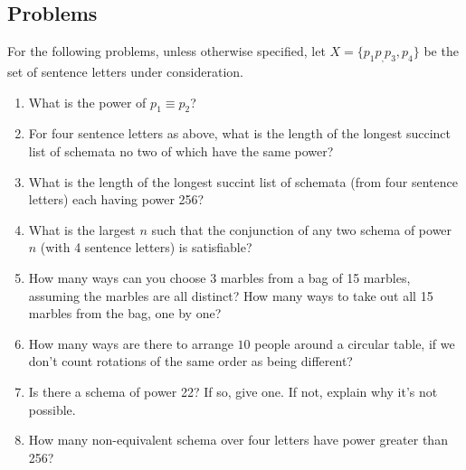 \newpage
\begin{mdframed}[linewidth=1]
\section*{Problems}
For the following problems, unless otherwise specified, let $X = \{p_1 p_, p_3, p_4\}$ be the set of sentence letters under consideration. 
\begin{enumerate}
    \item What is the power of $p_1 \equiv p_2$?

    \item For four sentence letters as above, what is the length of the longest succinct list of schemata no two of which have the same power?

    \item What is the length of the longest succint list of schemata (from four sentence letters) each having power 256?

    \item What is the largest $n$ such that the conjunction of any two schema of power $n$ (with 4 sentence letters) is satisfiable?

    \item How many ways can you choose 3 marbles from a bag of 15 marbles, assuming the marbles are all distinct? How many ways to take out all 15 marbles from the bag, one by one? 

    \item How many ways are there to arrange $10$ people around a circular table, if we don't count rotations of the same order as being different?

    \item Is there a schema of power 22? If so, give one. If not, explain why it's not possible.

    \item How many non-equivalent schema over four letters have power greater than 256?
\end{enumerate}
\end{mdframed}

